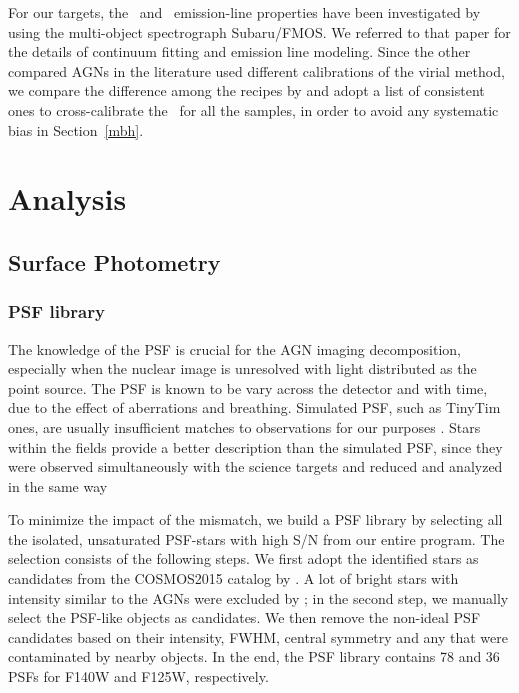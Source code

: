 \documentclass[apj]{emulateapj}
\begin{document}
For our targets, the \halpha\ and \hbeta\ emission-line properties have been investigated by \citet{Schulze2018} using the multi-object spectrograph Subaru/FMOS. We referred to that paper for the details of continuum fitting and emission line modeling. Since the other compared AGNs in the literature used different calibrations of the virial method, we compare the difference among the recipes by \citet{Schulze2018, McG++08, Ding2017b} and adopt a list of consistent ones to cross-calibrate the \mbh\ for all the samples, in order to avoid any systematic bias in Section~\ref{mbh}.
 
\section{Analysis}
\label{sec:analysis}

\subsection{Surface Photometry}
\subsubsection{PSF library}    
\label{sec:psf_library}
The knowledge of the PSF is crucial for the AGN imaging decomposition, especially when the nuclear image is unresolved with light distributed as the point source. The PSF is known to be vary across the detector and with time, due to the effect of aberrations and breathing. Simulated PSF, such as {\sc TinyTim} ones, are usually insufficient matches to observations for our purposes \citet{Mechtley2012}. Stars within the fields provide a better description than the simulated PSF, since they were observed simultaneously with the science targets and reduced and analyzed in the same way \citet{Kim2008, Park15}

To minimize the impact of the mismatch, we build a PSF library by selecting all the isolated, unsaturated PSF-stars with high S/N from our entire program. The selection consists of the following steps. We first adopt the identified stars as candidates from the COSMOS2015 catalog by \citet{Laigle2016}. A lot of bright stars with intensity similar to the AGNs were excluded by \citet{Laigle2016}; in the second step, we manually select the PSF-like objects as candidates. We then remove the non-ideal PSF candidates based on their intensity, FWHM, central symmetry and any that were contaminated by nearby objects. In the end, the PSF library contains 78 and 36 PSFs for F140W and F125W, respectively.
\end{document}
